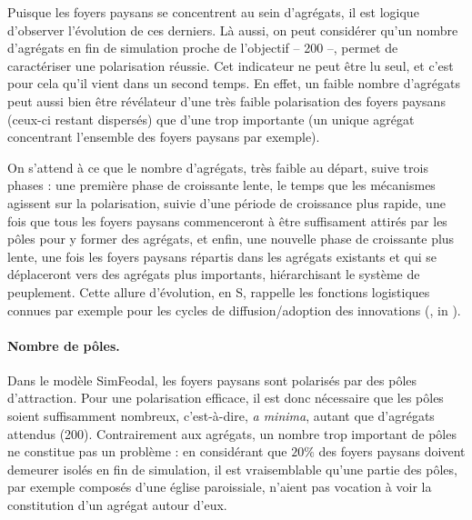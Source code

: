 Puisque les foyers paysans se concentrent au sein d'agrégats, il est logique d'observer l'évolution de ces derniers.
Là aussi, on peut considérer qu'un nombre d'agrégats en fin de simulation proche de l'objectif -- 200 --, permet de caractériser une polarisation réussie.
Cet indicateur ne peut être lu seul, et c'est pour cela qu'il vient dans un second temps.
En effet, un faible nombre d'agrégats peut aussi bien être révélateur d'une très faible polarisation des foyers paysans (ceux-ci restant dispersés) que d'une trop importante (un unique agrégat concentrant l'ensemble des foyers paysans par exemple).

On s'attend à ce que le nombre d'agrégats, très faible au départ, suive trois phases :
une première phase de croissante lente, le temps que les mécanismes agissent sur la polarisation, suivie d'une période de croissance plus rapide, une fois que tous les foyers paysans commenceront à être suffisament attirés par les pôles pour y former des agrégats, et enfin, une nouvelle phase de croissante plus lente, une fois les foyers paysans répartis dans les agrégats existants et qui se déplaceront vers des agrégats plus importants, hiérarchisant le système de peuplement.
Cette allure d'évolution, en \og S\fg{}, rappelle les fonctions logistiques connues par exemple pour les cycles de diffusion/adoption des innovations (\cite{hagerstrand1952propagation}, in \cite[28]{daude_modelisation_2002}).

\paragraph{Nombre de pôles.}\label{par:nb-poles}

Dans le modèle SimFeodal, les foyers paysans sont polarisés par des pôles d'attraction.
Pour une polarisation efficace, il est donc nécessaire que les pôles soient suffisamment nombreux, c'est-à-dire, \textit{a minima}, autant que d'agrégats attendus (200).
Contrairement aux agrégats, un nombre trop important de pôles ne constitue pas un problème :
	en considérant que $20\%$ des foyers paysans doivent demeurer isolés en fin de simulation, il est vraisemblable qu'une partie des pôles, par exemple composés d'une église paroissiale, n'aient pas vocation à voir la constitution d'un agrégat autour d'eux.

